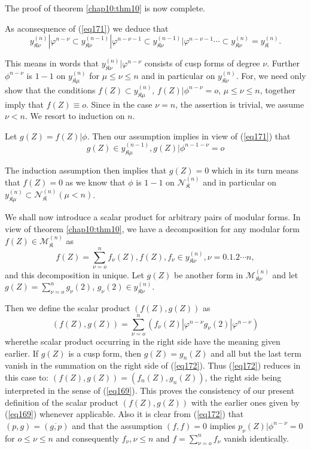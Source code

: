 The proof of theorem \ref{chap10:thm10} is now complete.

As a\pageoriginale  consequence of (\ref{eq171}) we deduce that 
$$
y^{(n)}_{\mathfrak{K} \nu} | \varphi^{n- \nu} \subset
y^{(n-1)}_{\mathfrak{K} \nu} | \varphi^{n- \nu-1} \subset
y^{(n-1)}_{\mathfrak{K} \nu} | \varphi^{n- \nu -1} \cdots \subset
y^{(n)}_{\mathfrak{K} \nu}= y^{(n)}_{\mathfrak{K}}. 
$$

This means in words that $y^{(n)}_{\mathfrak{K} \nu} |
\varphi^{n-\nu}$ consists of cusp forms of degree $\nu$. Further
$\phi^{n- \nu}$ is $1-1$ on $y^{(n)}_{\mathfrak{K} \mu}$ for $\mu
\le \nu \le n$ and in particular on $y^{(n)}_{\mathfrak{K}
  \nu}$. For, we need only show that the conditions $f(Z) \subset
y^{(n)}_{\mathfrak{K} \mu}$, $f(Z) | \phi^{n - \nu}=o$, $\mu \le
\nu \le n$, together imply that $f(Z) \equiv o$. Since in the case
$\nu= n$, the assertion is trivial, we assume $\nu < n$. We
resort to induction  on $n$. 

Let $g(Z) = f(Z) | \phi$. Then our assumption implies in view of
(\ref{eq171}) that  
$$
g(Z) \in y^{(n-1)}_{\mathfrak{K} \mu}, g(Z) | \phi^{n-1- \nu}=o
$$

The induction  assumption  then implies that $g(Z)=0$ which in its
turn means that $f(Z)=0$ as we know that $\phi$ is $1-1$ on
$\mathscr{N}^{(n)}_{\mathfrak{K}}$ and in particular on
$y^{(n)}_{\mathfrak{K} \mu} \subset
\mathscr{N}^{(n)}_{\mathfrak{K}}(\mu < n)$.  

We shall now introduce a scalar product for arbitrary pairs of modular
forms. In view of theorem \ref{chap10:thm10}, we have a decomposition  for any
modular form $f(Z) \in \mathscr{M}^{(n)}_{\mathfrak{K}}$ as  
$$
f(Z) = \sum^n_{\nu=o} f_\nu(Z), f(Z), f_\nu \in
y^{(n)}_{\mathfrak{K} \nu}, \nu=0.1.2 \cdots n, 
$$
and  this decomposition in unique. Let $g(Z)$ be another form in
$\mathscr{M}^{(n)}_{\mathfrak{K} \nu}$ and let $g(Z)= \sum^n_{\nu=o}
g_\nu(2)$, $g_\nu(2) \in y^{(n)}_{\mathfrak{K} \nu}$. 

Then we define the scalar product $(f(Z), g(Z))$ as
\begin{equation*}
 (f(Z), g(Z)) = \sum^n_{\nu=o} (f_\nu (Z) | \varphi^{n- \nu}
  g_{\nu}(2) | \varphi^{n- \nu})  \tag{172}\label{eq172}  
 \end{equation*}
 where\pageoriginale  the scalar product occurring in the right side
 have the meaning 
 given earlier. If $g(Z)$ is a cusp form, then $g(Z) =g_n(Z)$ and all
 but the last term vanish in the summation on the right side of
 (\ref{eq172}). Thus (\ref{eq172}) reduces in this case to: $(f(Z), g(Z))=
 (f_n(Z), g_n (Z))$, the right side being interpreted in the sense of
 (\ref{eq169}). This proves the consistency of our present definition of the
 scalar product $(f(Z), g(Z))$ with the earlier ones given by (\ref{eq169})
 whenever applicable. Also it is clear from (\ref{eq172})  that $(p,g)=
 (\overline{g,p})$ and that the assumption $(f,f)=0$ implies $p_\nu(Z)|
 \phi^{n- \nu}=0$ for $o \le \nu \le n$ and consequently $f_\nu, \nu
 \le n$ and $f= \sum^{n}_{\nu=o} f_\nu$ vanish identically.  
 
